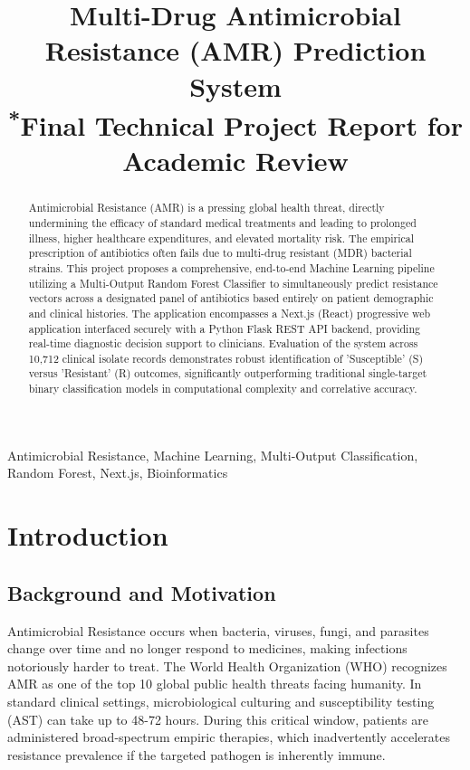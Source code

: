 \documentclass[conference]{IEEEtran}
\begin{document}
\title{Multi-Drug Antimicrobial Resistance (AMR) Prediction System\\
{\footnotesize \textsuperscript{*}Final Technical Project Report for Academic Review}
}

\author{
}

\maketitle

\begin{abstract}
Antimicrobial Resistance (AMR) is a pressing global health threat, directly undermining the efficacy of standard medical treatments and leading to prolonged illness, higher healthcare expenditures, and elevated mortality risk. The empirical prescription of antibiotics often fails due to multi-drug resistant (MDR) bacterial strains. This project proposes a comprehensive, end-to-end Machine Learning pipeline utilizing a Multi-Output Random Forest Classifier to simultaneously predict resistance vectors across a designated panel of antibiotics based entirely on patient demographic and clinical histories. The application encompasses a Next.js (React) progressive web application interfaced securely with a Python Flask REST API backend, providing real-time diagnostic decision support to clinicians. Evaluation of the system across 10,712 clinical isolate records demonstrates robust identification of 'Susceptible' (S) versus 'Resistant' (R) outcomes, significantly outperforming traditional single-target binary classification models in computational complexity and correlative accuracy.
\end{abstract}

\begin{IEEEkeywords}
Antimicrobial Resistance, Machine Learning, Multi-Output Classification, Random Forest, Next.js, Bioinformatics
\end{IEEEkeywords}

\section{Introduction}

\subsection{Background and Motivation}
Antimicrobial Resistance occurs when bacteria, viruses, fungi, and parasites change over time and no longer respond to medicines, making infections notoriously harder to treat. The World Health Organization (WHO) recognizes AMR as one of the top 10 global public health threats facing humanity. In standard clinical settings, microbiological culturing and susceptibility testing (AST) can take up to 48-72 hours. During this critical window, patients are administered broad-spectrum empiric therapies, which inadvertently accelerates resistance prevalence if the targeted pathogen is inherently immune. 
\end{document}
